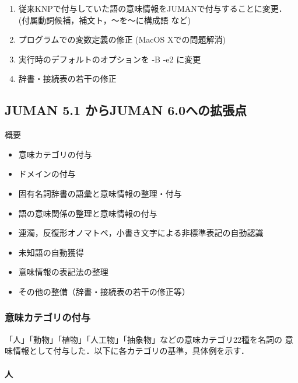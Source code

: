 \documentclass[a4j,titlepage]{jarticle}
\begin{document}
\begin{enumerate}
\item 従来KNPで付与していた語の意味情報をJUMANで付与することに変更．
      (付属動詞候補，補文ト，〜を〜に構成語 など)

\item プログラムでの変数定義の修正 (MacOS Xでの問題解消)

\item 実行時のデフォルトのオプションを -B -e2 に変更

\item 辞書・接続表の若干の修正
\end{enumerate}


\subsection{JUMAN 5.1 からJUMAN 6.0への拡張点}
\label{subsec:6.0}

概要
\begin{itemize}
\item 意味カテゴリの付与
\item ドメインの付与
\item 固有名詞辞書の語彙と意味情報の整理・付与
\item 語の意味関係の整理と意味情報の付与
\item 連濁，反復形オノマトペ，小書き文字による非標準表記の自動認識
\item 未知語の自動獲得
\item 意味情報の表記法の整理
\item その他の整備（辞書・接続表の若干の修正等）
\end{itemize}

\subsubsection{意味カテゴリの付与}

「人」「動物」「植物」「人工物」「抽象物」などの意味カテゴリ22種を名詞の
意味情報として付与した．以下に各カテゴリの基準，具体例を示す．


\paragraph{人}
\end{document}
